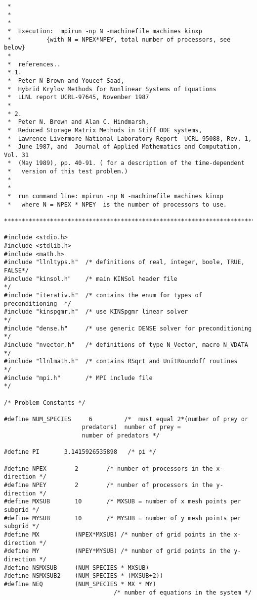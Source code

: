 \begin{verbatim}
 * 
 *
 * 
 *  Execution:  mpirun -np N -machinefile machines kinxp
 *          {with N = NPEX*NPEY, total number of processors, see below}
 *
 *  references..
 * 1.
 *  Peter N Brown and Youcef Saad,
 *  Hybrid Krylov Methods for Nonlinear Systems of Equations
 *  LLNL report UCRL-97645, November 1987
 *  
 * 2.
 *  Peter N. Brown and Alan C. Hindmarsh,
 *  Reduced Storage Matrix Methods in Stiff ODE systems,
 *  Lawrence Livermore National Laboratory Report  UCRL-95088, Rev. 1,
 *  June 1987, and  Journal of Applied Mathematics and Computation, Vol. 31
 *  (May 1989), pp. 40-91. ( for a description of the time-dependent
 *   version of this test problem.)
 *
 *
 *  run command line: mpirun -np N -machinefile machines kinxp 
 *   where N = NPEX * NPEY  is the number of processors to use.
 ************************************************************************/

#include <stdio.h>
#include <stdlib.h>
#include <math.h>
#include "llnltyps.h"  /* definitions of real, integer, boole, TRUE, FALSE*/
#include "kinsol.h"    /* main KINSol header file                         */
#include "iterativ.h"  /* contains the enum for types of preconditioning  */
#include "kinspgmr.h"  /* use KINSpgmr linear solver                      */
#include "dense.h"     /* use generic DENSE solver for preconditioning    */
#include "nvector.h"   /* definitions of type N_Vector, macro N_VDATA     */
#include "llnlmath.h"  /* contains RSqrt and UnitRoundoff routines        */
#include "mpi.h"       /* MPI include file                                */

/* Problem Constants */

#define NUM_SPECIES     6         /*  must equal 2*(number of prey or
				      predators)  number of prey = 
				      number of predators */

#define PI       3.1415926535898   /* pi */ 

#define NPEX        2        /* number of processors in the x-direction */
#define NPEY        2        /* number of processors in the y-direction */
#define MXSUB       10       /* MXSUB = number of x mesh points per subgrid */
#define MYSUB       10       /* MYSUB = number of y mesh points per subgrid */
#define MX          (NPEX*MXSUB) /* number of grid points in the x-direction */
#define MY          (NPEY*MYSUB) /* number of grid points in the y-direction */
#define NSMXSUB     (NUM_SPECIES * MXSUB)
#define NSMXSUB2    (NUM_SPECIES * (MXSUB+2))
#define NEQ         (NUM_SPECIES * MX * MY)  
                               /* number of equations in the system */


\end{verbatim}
